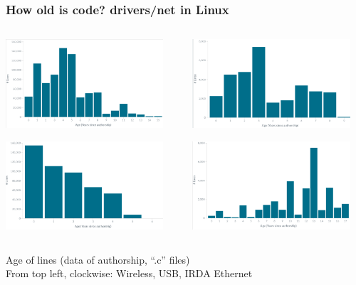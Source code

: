 \documentclass[17pt,aspectratio=169,hyperref=pdfusetitle]{beamer}
\begin{document}
\begin{frame}
\frametitle{How old is code? drivers/net in Linux}

\begin{columns}[T]
\begin{column}{.48\textwidth}

  \includegraphics[height=3.3cm]{figs/linux-age-net-wireless-c}

  \includegraphics[height=3.3cm]{figs/linux-age-net-ethernet-c}

\end{column}%
\hfill%
\begin{column}{.50\textwidth}

  \includegraphics[height=3.3cm]{figs/linux-age-net-usb-c}

  \includegraphics[height=3.3cm]{figs/linux-age-net-irda-c}

\end{column}%
\end{columns}
  
Age of lines (data of authorship, ``.c'' files) \\
From top left, clockwise: Wireless, USB, IRDA Ethernet

\end{frame}
\end{document}
